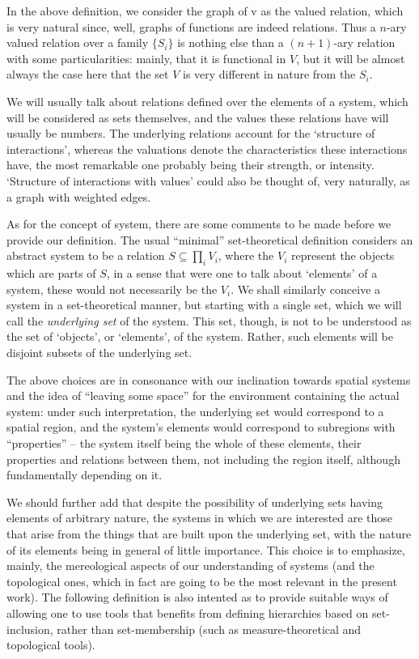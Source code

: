 \documentclass[12pt, a4paper]{article} %
\theoremstyle{definition}
\begin{document}
	In the above definition, we consider the graph of $\mathrm{v}$ as the valued relation, which is very natural since, well, graphs of functions are indeed relations. Thus a $n$-ary valued relation over a family $\{S_i\}$ is nothing else than a $(n+1)$-ary relation with some particularities: mainly, that it is functional in $V$, but it will be almost always the case here that the set $V$ is very different in nature from the $S_i$. 
	
	We will usually talk about relations defined over the elements of a system, which will be considered as sets themselves, and the values these relations have will usually be numbers. The underlying relations account for the `structure of interactions', whereas the valuations denote the characteristics these interactions have, the most remarkable one probably being their strength, or intensity. `Structure of interactions with values' could also be thought of, very naturally, as a graph with weighted edges.
	
	As for the concept of system, there are some comments to be made before we provide our definition. The usual ``minimal'' \cite{Mesarovic1989} set-theoretical definition considers an abstract system to be a relation $S \subseteq \prod_i V_i$, where the $V_i$ represent the objects which are parts of $S$, in a sense that were one to talk about `elements' of a system, these would not necessarily be the $V_i$. We shall similarly conceive a system in a set-theoretical manner, but starting with a single set, which we will call the \textit{underlying set} of the system. This set, though, is not to be understood as the set of `objects', or `elements', of the system. Rather, such elements will be disjoint subsets of the underlying set. 
	
	The above choices are in consonance with our inclination towards spatial systems and the idea of ``leaving some space'' for the environment containing the actual system: under such interpretation, the underlying set would correspond to a spatial region, and the system's elements would correspond to subregions with ``properties'' -- the system itself being the whole of these elements, their properties and relations between them, not including the region itself, although fundamentally depending on it. 
	
	We should further add that despite the possibility of underlying sets having elements of arbitrary nature, the systems in which we are interested are those that arise from the things that are built upon the underlying set, with the nature of its elements being in general of little importance. This choice is to emphasize, mainly, the mereological aspects of our understanding of systems (and the topological ones, which in fact are going to be the most relevant in the present work). The following definition is also intented as to provide suitable ways of allowing one to use tools that benefits from defining hierarchies based on set-inclusion, rather than set-membership (such as measure-theoretical and topological tools). 
	
\end{document}
